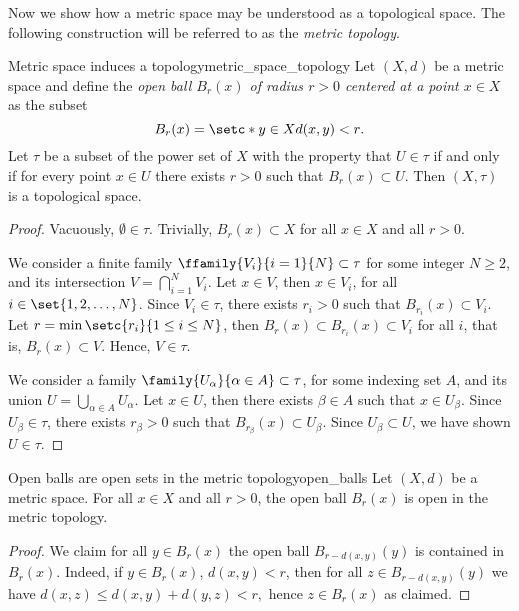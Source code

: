 Now we show how a metric space may be understood as a topological space. The following construction will be referred to as the \emph{metric topology}.
\begin{theorem}{Metric space induces a topology}{metric_space_topology}
    Let \((X, d)\) be a metric space and define the \emph{open ball \(B_r(x)\) of radius \(r > 0\) centered at a point \(x \in X\)} as the subset
    \begin{equation*}
        B_r(x) = \setc*{y \in X}{d(x,y) < r}.
    \end{equation*}
    Let \(\tau\) be a subset of the power set of \(X\) with the property that \(U \in \tau\) if and only if for every point \(x \in U\) there exists \(r > 0\) such that \(B_r(x) \subset U\). Then \((X, \tau)\) is a topological space.
\end{theorem}
\begin{proof}
    Vacuously, \(\emptyset \in \tau\). Trivially, \(B_r(x) \subset X\) for all \(x \in X\) and all \(r > 0\).

    We consider a finite family \(\ffamily{V_i}{i=1}{N}\subset \tau\) for some integer \(N \geq 2\), and its intersection \(V = \bigcap_{i=1}^{N} V_i\). Let \(x \in V\), then \(x \in V_i\), for all \(i \in \set{1,2,\dots, N}\). Since \(V_i \in \tau\), there exists \(r_i > 0\) such that \(B_{r_i}(x) \subset V_i\). Let \(r = \min\setc{r_i}{1 \leq i \leq N}\), then \(B_r(x) \subset B_{r_i}(x) \subset V_i\) for all \(i\), that is, \(B_r(x) \subset V\). Hence, \(V \in \tau\).

    We consider a family \(\family{U_\alpha}{\alpha \in A} \subset \tau\), for some indexing set \(A\), and its union \(U = \bigcup_{\alpha \in A} U_{\alpha}\). Let \(x \in U\), then there exists \(\beta \in A\) such that \(x \in U_\beta\). Since \(U_\beta \in \tau\), there exists \(r_\beta > 0\) such that \(B_{r_\beta}(x) \subset U_\beta\). Since \(U_\beta \subset U\), we have shown \(U \in \tau\).
\end{proof}


\begin{lemma}{Open balls are open sets in the metric topology}{open_balls}
    Let \((X,d)\) be a metric space. For all \(x \in X\) and all \(r > 0\), the open ball \(B_r(x)\) is open in the metric topology.
\end{lemma}
\begin{proof}
    We claim for all \(y \in B_r(x)\) the open ball \(B_{r - d(x,y)}(y)\) is contained in \(B_r(x)\). Indeed, if \(y \in B_r(x)\), \(d(x,y) < r\), then for all \(z \in B_{r - d(x,y)}(y)\) we have \(d(x,z) \leq d(x,y) + d(y, z) < r,\) hence \(z \in B_r(x)\) as claimed.
\end{proof}

